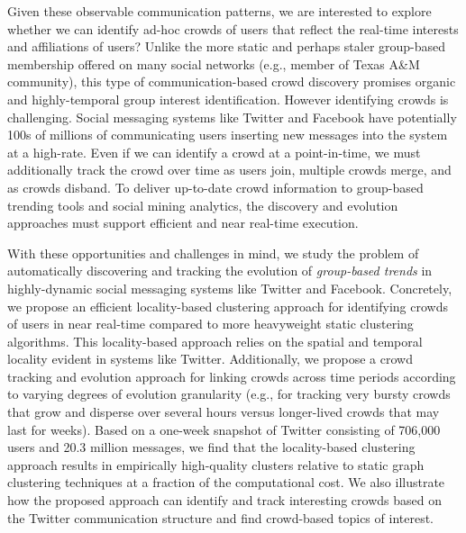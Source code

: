 \documentclass{sig-alternate}
\begin{document}
Given these observable communication patterns, we are interested to explore whether we can identify ad-hoc crowds of
users that reflect the real-time interests and affiliations of users? Unlike the
more static and perhaps staler group-based membership offered on many social
networks (e.g., member of Texas A\&M community), this type of 
communication-based crowd discovery promises organic and highly-temporal group
interest identification. 
However identifying crowds is challenging. Social messaging systems like Twitter
and Facebook have potentially 100s of millions of communicating users inserting
new messages into the system at a high-rate. Even if we can identify a crowd at a
point-in-time, we must additionally track the crowd over time as users join,
multiple crowds merge, and as crowds disband. To deliver up-to-date  crowd
information to group-based trending tools and social mining analytics, the discovery and evolution
approaches must support efficient and near real-time execution.

With these opportunities and challenges in mind, we study the problem of automatically discovering and tracking the evolution of \textit{group-based trends} in highly-dynamic social messaging systems like Twitter and Facebook. Concretely, we propose an efficient locality-based clustering approach for identifying crowds of users in near real-time compared to more heavyweight static clustering algorithms. This locality-based approach relies on the spatial and temporal locality evident in systems like Twitter. Additionally, we propose a crowd tracking and evolution approach for linking crowds across time periods according to varying degrees of evolution granularity (e.g., for tracking very bursty crowds that grow and disperse over several hours versus longer-lived crowds that may last for weeks). Based on a one-week snapshot of Twitter consisting of 706,000 users and 20.3 million messages, we find that the locality-based clustering approach results in empirically high-quality clusters relative to static graph clustering techniques at a fraction of the computational cost. We also  illustrate how the proposed approach can identify and track interesting crowds based on the Twitter communication structure and find crowd-based topics of interest.
\end{document}
